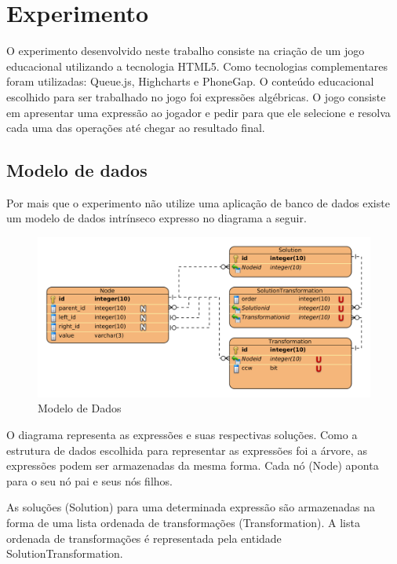 \part{Experimento}
O experimento desenvolvido neste trabalho consiste na criação de um jogo educacional utilizando a tecnologia HTML5. Como tecnologias complementares foram utilizadas: Queue.js, Highcharts e PhoneGap. O conteúdo educacional escolhido para ser trabalhado no jogo foi expressões algébricas. O jogo consiste em apresentar uma expressão ao jogador e pedir para que ele selecione e resolva cada uma das operações até chegar ao resultado final.

\chapter{Modelo de dados}
Por mais que o experimento não utilize uma aplicação de banco de dados existe um modelo de dados intrínseco expresso no diagrama a seguir.

\begin{figure}[H]
	\caption{\label{gram_cls}Modelo de Dados}
	\begin{center}
	    \includegraphics[scale=0.9]{datamodel.png}
	\end{center}
\end{figure}

O diagrama representa as expressões e suas respectivas soluções. Como a estrutura de dados escolhida para representar as expressões foi a árvore, as expressões podem ser armazenadas da mesma forma. Cada nó (Node) aponta para o seu nó pai e seus nós filhos.

As soluções (Solution) para uma determinada expressão são armazenadas na forma de uma lista ordenada de transformações (Transformation). A lista ordenada de transformações é representada pela entidade SolutionTransformation.

